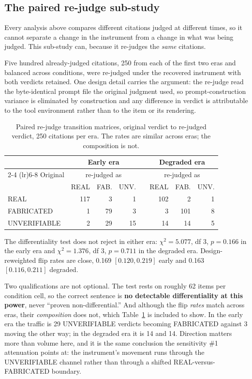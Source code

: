\subsection{The paired re-judge sub-study}

Every analysis above compares different citations judged at different times, so
it cannot separate a change in the instrument from a change in what was being
judged. This sub-study can, because it re-judges the \emph{same} citations.

Five hundred already-judged citations, 250 from each of the first two eras and
balanced across conditions, were re-judged under the recovered instrument with
both verdicts retained. One design detail carries the argument: the re-judge read
the byte-identical prompt file the original judgment used, so
prompt-construction variance is eliminated by construction and any difference in
verdict is attributable to the tool environment rather than to the item or its
rendering.

\begin{table}[htbp]
\centering
\small
\caption{Paired re-judge transition matrices, original verdict to re-judged
verdict, 250 citations per era. The rates are similar across eras; the
composition is not.}
\label{tab:t7}
\begin{tabular}{@{}l rrr c rrr@{}}
\toprule
 & \multicolumn{3}{c}{Early era} & & \multicolumn{3}{c}{Degraded era} \\
\cmidrule(lr){2-4} \cmidrule(lr){6-8}
Original & \multicolumn{3}{c}{re-judged as} & & \multicolumn{3}{c}{re-judged as} \\
 & REAL & FAB. & UNV. & & REAL & FAB. & UNV. \\
\midrule
REAL         & 117 & 3  & 1  & & 102 & 2  & 1 \\
FABRICATED   & 1   & 79 & 3  & & 3   & 101 & 8 \\
UNVERIFIABLE & 2   & 29 & 15 & & 14  & 14 & 5 \\
\bottomrule
\end{tabular}
\end{table}

The differentiality test does not reject in either era: $\chi^2 = 5.077$, df 3,
$p = 0.166$ in the early era and $\chi^2 = 1.376$, df 3, $p = 0.711$ in the
degraded era. Design-reweighted flip rates are close, 0.169 $[0.120, 0.219]$
early and 0.163 $[0.116, 0.211]$ degraded.

Two qualifications are not optional. The test rests on roughly 62 items per
condition cell, so the correct sentence is \textbf{no detectable differentiality
at this power}, never ``proven non-differential.'' And although the flip
\emph{rates} match across eras, their \emph{composition} does not, which
Table~\ref{tab:t7} is included to show. In the early era the traffic is 29
UNVERIFIABLE verdicts becoming FABRICATED against 3 moving the other way; in the
degraded era it is 14 and 14. Direction matters more than volume here, and it is
the same conclusion the sensitivity \#1 attenuation points at: the instrument's
movement runs through the UNVERIFIABLE channel rather than through a shifted
REAL-versus-FABRICATED boundary.

